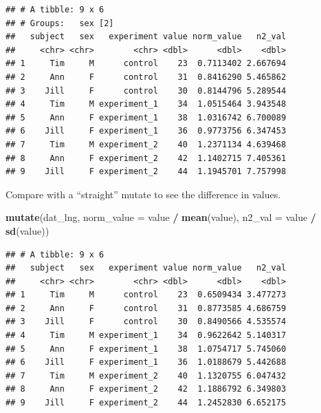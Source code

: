 \documentclass[]{book}
\newenvironment{Shaded}{\begin{snugshade}}{\end{snugshade}}
\newcommand{\KeywordTok}[1]{\textcolor[rgb]{0.13,0.29,0.53}{\textbf{#1}}}
\newcommand{\DataTypeTok}[1]{\textcolor[rgb]{0.13,0.29,0.53}{#1}}
\newcommand{\StringTok}[1]{\textcolor[rgb]{0.31,0.60,0.02}{#1}}
\newcommand{\OperatorTok}[1]{\textcolor[rgb]{0.81,0.36,0.00}{\textbf{#1}}}
\newcommand{\NormalTok}[1]{#1}
\begin{document}
\begin{Shaded}
\end{Shaded}

\begin{verbatim}
## # A tibble: 9 x 6
## # Groups:   sex [2]
##   subject   sex   experiment value norm_value   n2_val
##     <chr> <chr>        <chr> <dbl>      <dbl>    <dbl>
## 1     Tim     M      control    23  0.7113402 2.667694
## 2     Ann     F      control    31  0.8416290 5.465862
## 3    Jill     F      control    30  0.8144796 5.289544
## 4     Tim     M experiment_1    34  1.0515464 3.943548
## 5     Ann     F experiment_1    38  1.0316742 6.700089
## 6    Jill     F experiment_1    36  0.9773756 6.347453
## 7     Tim     M experiment_2    40  1.2371134 4.639468
## 8     Ann     F experiment_2    42  1.1402715 7.405361
## 9    Jill     F experiment_2    44  1.1945701 7.757998
\end{verbatim}

Compare with a ``straight'' mutate to see the difference in values.

\begin{Shaded}
\begin{Highlighting}[]
\KeywordTok{mutate}\NormalTok{(dat_lng, }
       \DataTypeTok{norm_value =}\NormalTok{ value }\OperatorTok{/}\StringTok{ }\KeywordTok{mean}\NormalTok{(value), }
       \DataTypeTok{n2_val =}\NormalTok{ value }\OperatorTok{/}\StringTok{ }\KeywordTok{sd}\NormalTok{(value))}
\end{Highlighting}
\end{Shaded}

\begin{verbatim}
## # A tibble: 9 x 6
##   subject   sex   experiment value norm_value   n2_val
##     <chr> <chr>        <chr> <dbl>      <dbl>    <dbl>
## 1     Tim     M      control    23  0.6509434 3.477273
## 2     Ann     F      control    31  0.8773585 4.686759
## 3    Jill     F      control    30  0.8490566 4.535574
## 4     Tim     M experiment_1    34  0.9622642 5.140317
## 5     Ann     F experiment_1    38  1.0754717 5.745060
## 6    Jill     F experiment_1    36  1.0188679 5.442688
## 7     Tim     M experiment_2    40  1.1320755 6.047432
## 8     Ann     F experiment_2    42  1.1886792 6.349803
## 9    Jill     F experiment_2    44  1.2452830 6.652175
\end{verbatim}
\end{document}
